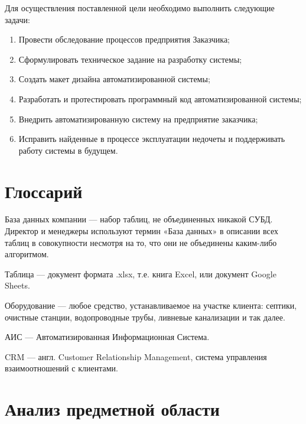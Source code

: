 \documentclass[a4paper,12pt]{article}
\begin{document}
Для осуществления поставленной цели необходимо выполнить следующие задачи:
\begin{enumerate}
    \item Провести обследование процессов предприятия Заказчика;
    \item Сформулировать техническое задание на разработку системы;
    \item Создать макет дизайна автоматизированной системы;
    \item Разработать и протестировать программный код автоматизированной системы;
    \item Внедрить автоматизированную систему на предприятие заказчика;
    \item Исправить найденные в процессе эксплуатации недочеты и поддерживать работу системы в будущем.
\end{enumerate}




\newpage
\section*{Глоссарий}

База данных компании --- набор таблиц, не объединенных никакой СУБД. Директор и менеджеры используют термин «База данных» в описании всех таблиц в совокупности несмотря на то, что они не объединены каким-либо алгоритмом.

Таблица --- документ формата .xlsx, т.е. книга Excel, или документ Google Sheets.

Оборудование --- любое средство, устанавливаемое на участке клиента: септики, очистные станции, водопроводные трубы, ливневые канализации и так далее.

АИС --- Автоматизированная Информационная Система.

CRM --- англ. Customer Relationship Management, система управления взаимоотношений с клиентами.





\newpage
\section{Анализ предметной области}
\end{document}
